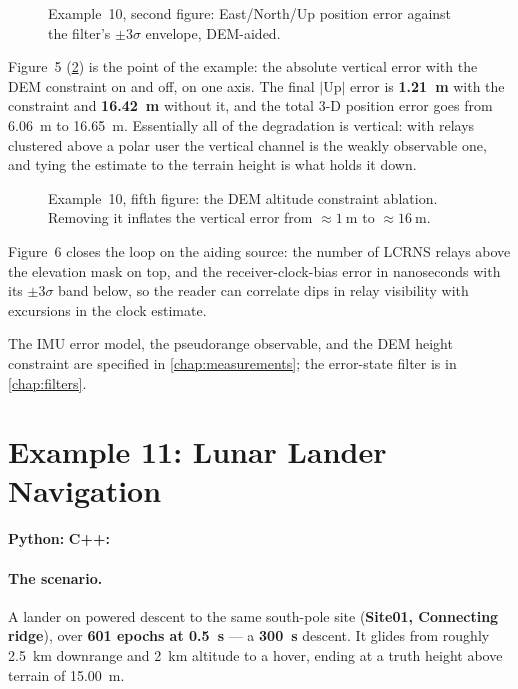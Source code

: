 \begin{figure}[htbp]
  \centering
  \caption{Example~10, second figure: East/North/Up position error against the
           filter's $\pm3\sigma$ envelope, DEM-aided.}
  \label{fig:tut-ex10-err}
\end{figure}

Figure~5 (\cref{fig:tut-ex10-dem}) is the point of the example: the absolute
vertical error with the DEM constraint on and off, on one axis. The final
$|\mathrm{Up}|$ error is \textbf{\SI{1.21}{\meter}} with the constraint and
\textbf{\SI{16.42}{\meter}} without it, and the total 3-D position error goes
from \SI{6.06}{\meter} to \SI{16.65}{\meter}. Essentially all of the degradation
is vertical: with relays clustered above a polar user the vertical channel is
the weakly observable one, and tying the estimate to the terrain height is what
holds it down.

\begin{figure}[htbp]
  \centering
  \caption{Example~10, fifth figure: the DEM altitude constraint ablation.
           Removing it inflates the vertical error from
           $\approx\SI{1}{\meter}$ to $\approx\SI{16}{\meter}$.}
  \label{fig:tut-ex10-dem}
\end{figure}

Figure~6 closes the loop on the aiding source: the number of LCRNS relays above
the elevation mask on top, and the receiver-clock-bias error in nanoseconds with
its $\pm3\sigma$ band below, so the reader can correlate dips in relay
visibility with excursions in the clock estimate.

The IMU error model, the pseudorange observable, and the DEM height constraint
are specified in \cref{chap:measurements}; the error-state filter is in
\cref{chap:filters}.

\section{Example 11: Lunar Lander Navigation}
\label{sec:tut-ex11}

\textbf{Python:}  \quad
\textbf{C++:} 

\paragraph{The scenario.}
A lander on powered descent to the same south-pole site (\textbf{Site01,
Connecting ridge}), over \textbf{601 epochs at \SI{0.5}{\second}} --- a
\textbf{\SI{300}{\second}} descent. It glides from roughly \SI{2.5}{\kilo\meter}
downrange and \SI{2}{\kilo\meter} altitude to a hover, ending at a truth height
above terrain of \SI{15.00}{\meter}.

